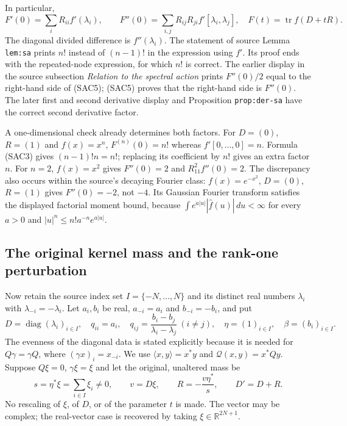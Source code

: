 In particular,
\begin{equation}\tag{SAC5}
 F'(0)=\sum_i R_{ii}f'(\lambda_i),\qquad
 F''(0)=\sum_{i,j}R_{ij}R_{ji}f'[\lambda_i,\lambda_j],
 \quad F(t)=\operatorname{tr}f(D+tR).
\end{equation}
The diagonal divided difference is $f''(\lambda_i)$.
The statement of source Lemma \texttt{lem:sa} prints $n!$
instead of $(n-1)!$ in the expression using $f'$. Its proof
ends with the repeated-node expression, for which $n!$ is
correct. The earlier display in the source subsection
\emph{Relation to the spectral action} prints $F''(0)/2$
equal to the right-hand side of (SAC5); (SAC5) proves that the
right-hand side is $F''(0)$. The later first and second derivative
display and Proposition \texttt{prop:der-sa} have the correct
second derivative factor.

A one-dimensional check already determines both factors. For
$D=(0)$, $R=(1)$ and $f(x)=x^n$, $F^{(n)}(0)=n!$ whereas
$f'[0,\ldots,0]=n$. Formula (SAC3) gives
$(n-1)!n=n!$; replacing its coefficient by $n!$ gives an extra
factor $n$. For $n=2$, $f(x)=x^2$ gives $F''(0)=2$ and
$R_{11}^2f''(0)=2$. The discrepancy also occurs within the
source's decaying Fourier class: $f(x)=e^{-x^2}$, $D=(0)$,
$R=(1)$ gives $F''(0)=-2$, not $-4$. Its Gaussian Fourier
transform satisfies the displayed factorial moment bound,
because $\int e^{a|u|}|\widehat f(u)|\,du<\infty$ for every
$a>0$ and $|u|^n\leq n!a^{-n}e^{a|u|}$.

\subsection{The original kernel mass and the rank-one perturbation}

Now retain the source index set $I=\{-N,\ldots,N\}$ and its
distinct real numbers $\lambda_i$ with $\lambda_{-i}=-\lambda_i$.
Let $a_i,b_i$ be real, $a_{-i}=a_i$ and $b_{-i}=-b_i$, and put
\begin{equation}\tag{SAC6}
 D=\operatorname{diag}(\lambda_i)_{i\in I},\quad
 q_{ii}=a_i,\quad
 q_{ij}=\frac{b_i-b_j}{\lambda_i-\lambda_j}\ (i\ne j),\quad
 \eta=(1)_{i\in I},\quad\beta=(b_i)_{i\in I}.
\end{equation}
The evenness of the diagonal data is stated explicitly because
it is needed for $Q\gamma=\gamma Q$, where
$(\gamma x)_i=x_{-i}$. We use
$\langle x,y\rangle=x^*y$ and
$\mathcal Q(x,y)=x^*Qy$. Suppose $Q\xi=0$, $\gamma\xi=\xi$
and let the original, unaltered mass be
\begin{equation}\tag{SAC7}
 s=\eta^*\xi=\sum_{i\in I}\xi_i\ne0,\qquad
 v=D\xi,\qquad R=-\frac{v\eta^*}{s},\qquad D'=D+R.
\end{equation}
No rescaling of $\xi$, of $D$, or of the parameter $t$ is made.
The vector may be complex; the real-vector case is recovered
by taking $\xi\in\mathbb R^{2N+1}$.

